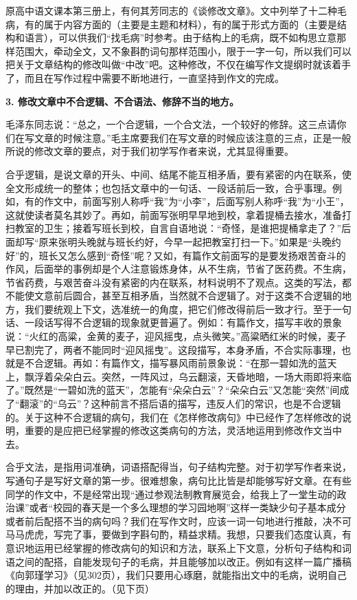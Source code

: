 原高中语文课本第三册上，有何其芳同志的《谈修改文章》。文中列举了十二种毛病，有的属于内容方面的（主要是主题和材料），有的属于形式方面的（主要是结构和语言），可以供我们“找毛病”时参考。由于结构上的毛病，既不如构思立意那样范围大，牵动全文，又不象斟酌词句那样范围小，限于一字一句，所以我们可以把关于文章结构的修改叫做“中改”吧。这种修改，不仅在编写作文提纲时就该着手了，而且在写作过程中需要不断地进行，一直坚持到作文的完成。

\textbf{3. 修改文章中不合逻辑、不合语法、修辞不当的地方。}

毛泽东同志说：“总之，一个合逻辑，一个合文法，一个较好的修辞。这三点请你们在写文章的时候注意。”毛主席要我们在写文章的时候应该注意的三点，正是一般所说的修改文章的要点，对于我们初学写作者来说，尤其显得重要。

合乎逻辑，是说文章的开头、中间、结尾不能互相矛盾，要有紧密的内在联系，使全文形成统一的整体；也包括文章中的一句话、一段话前后一致，合乎事理。例如，有的作文中，前面写别人称呼“我”为“小李”，后面写别人称呼“我”为“小王”，这就使读者莫名其妙了。再如，前面写张明早早地到校，拿着提桶去接水，准备打扫教室的卫生；接着写班长到校，自言自语地说：“奇怪，是谁把提桶拿走了？”后面却写“原来张明头晚就与班长约好，今早一起把教室打扫一下。”如果是“头晚约好”的，班长又怎么感到“奇怪”呢？又如，有篇作文前面写的是要发扬艰苦奋斗的作风，后面举的事例却是个人注意锻炼身体，从不生病，节省了医药费。不生病，节省药费，与艰苦奋斗没有紧密的内在联系，材料说明不了观点。这类的写法，都不能使文意前后圆合，甚至互相矛盾，当然就不合逻辑了。对于这类不合逻辑的地方，我们要统观上下文，选准统一的角度，把它们修改得前后一致才行。至于一句话、一段话写得不合逻辑的现象就更普遍了。例如：有篇作文，描写丰收的景象说：“火红的高粱，金黄的麦子，迎风摇曳，点头微笑。”高粱晒红米的时候，麦子早已割完了，两者不能同时“迎风摇曳”。这段描写，本身矛盾，不合实际事理，也就是不合逻辑。再如：有篇作文，描写暴风雨前景象说：“在那一碧如洗的蓝天上，飘浮着朵朵白云。突然，一阵风过，乌云翻滚，天昏地暗，一场大雨即将来临了。”既然是“一碧如洗的蓝天”，怎能有“朵朵白云”？“朵朵白云”又怎能“突然”间成了“翻滚”的“乌云”？这种前言不搭后语的描写，违反人们的常识，也是不合逻辑的。关于这种不合逻辑的病句，我们在《怎样修改病句》中已经作了怎样修改的说明，重要的是应把已经掌握的修改这类病句的方法，灵活地运用到修改作文当中去。

合乎文法，是指用词准确，词语搭配得当，句子结构完整。对于初学写作者来说，写通句子是写好文章的第一步。很难想象，病句比比皆是却能够写好文章。在有些同学的作文中，不是经常出现“通过参观法制教育展览会，给我上了一堂生动的政治课”或者“校园的春天是一个多么理想的学习园地啊”这样一类缺少句子基本成分或者前后配搭不当的病句吗？我们在写作文时，应该一词一句地进行推敲，决不可马马虎虎，写完了事，要做到字斟句酌，精益求精。我想，只要我们态度认真，有意识地运用已经掌握的修改病句的知识和方法，联系上下文意，分析句子结构和词语之间的配搭，自能发现句子的毛病，并且能够加以改正。例如有这样一篇广播稿《向郭瑾学习》（见302页），我们只要用心琢磨，就能指出文中的毛病，说明自己的理由，并加以改正的。（见下页）
\newpage

